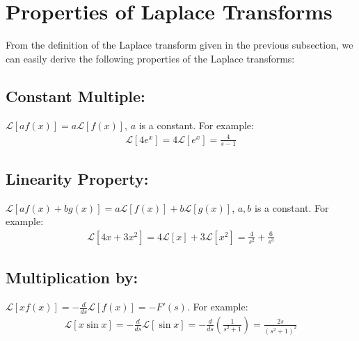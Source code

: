 \documentclass[11pt]{report}
\begin{document}
	\section{Properties of Laplace Transforms}
	From the definition of the Laplace transform given in the previous subsection, we can easily derive the following properties of the Laplace transforms:
	
	\subsection{Constant Multiple:} 
	$\mathcal{L}[af(x)] = a \mathcal{L}[f(x)]$, $a$ is a constant. For example:
	\begin{eqnarray*}
		\mathcal{L}[4e^x] = 4 \mathcal{L}[e^x] = \frac{4}{s - 1}
	\end{eqnarray*}
	
	\subsection{Linearity Property:}
	$\mathcal{L}[af(x) + bg(x)] = a \mathcal{L}[f(x)] +  b \mathcal{L}[g(x)]$, $a,b$ is a constant. For example:
	\begin{eqnarray*}
		\mathcal{L}[4x + 3x^2] = 4 \mathcal{L}[x] + 3 \mathcal{L}[x^2]= \frac{4}{s ^2} + \frac{6}{s^3}
	\end{eqnarray*}
		
	\subsection{Multiplication by:} 
	$\mathcal{L}[xf(x)] = - \frac{d}{ds} \mathcal{L}[f(x)] = -F'(s)$. For example:
	\begin{eqnarray*}
		\mathcal{L}[x\sin x] = - \frac{d}{ds} \mathcal{L}[\sin x] = - \frac{d}{ds} (\frac{1}{s^2 + 1}) = \frac{2s}{(s^2 + 1)^2}
	\end{eqnarray*}
\end{document}
